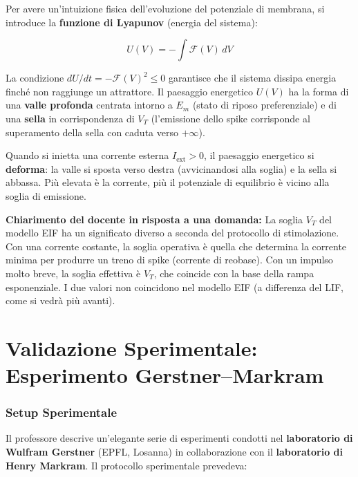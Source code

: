 Per avere un'intuizione fisica dell'evoluzione del potenziale di membrana, si introduce la \textbf{funzione di Lyapunov} (energia del sistema):

\begin{equation}
U(V) = -\int \mathcal{F}(V)\, dV
\end{equation}

La condizione $dU/dt = -\mathcal{F}(V)^2 \leq 0$ garantisce che il sistema dissipa energia finché non raggiunge un attrattore. Il paesaggio energetico $U(V)$ ha la forma di una \textbf{valle profonda} centrata intorno a $E_m$ (stato di riposo preferenziale) e di una \textbf{sella} in corrispondenza di $V_T$ (l'emissione dello spike corrisponde al superamento della sella con caduta verso $+\infty$).

Quando si inietta una corrente esterna $I_{\text{ext}} > 0$, il paesaggio energetico si \textbf{deforma}: la valle si sposta verso destra (avvicinandosi alla soglia) e la sella si abbassa. Più elevata è la corrente, più il potenziale di equilibrio è vicino alla soglia di emissione.

\begin{tcolorbox}[colback=gray!5, colframe=gray!40, arc=2mm, boxrule=0.5pt]
\textbf{Chiarimento del docente in risposta a una domanda:} La soglia $V_T$ del modello EIF ha un significato diverso a seconda del protocollo di stimolazione. Con una corrente costante, la soglia operativa è quella che determina la corrente minima per produrre un treno di spike (corrente di reobase). Con un impulso molto breve, la soglia effettiva è $V_T$, che coincide con la base della rampa esponenziale. I due valori non coincidono nel modello EIF (a differenza del LIF, come si vedrà più avanti).
\end{tcolorbox}

\section{Validazione Sperimentale: Esperimento Gerstner–Markram}

\subsubsection{Setup Sperimentale}

Il professore descrive un'elegante serie di esperimenti condotti nel \textbf{laboratorio di Wulfram Gerstner} (EPFL, Losanna) in collaborazione con il \textbf{laboratorio di Henry Markram}. Il protocollo sperimentale prevedeva:

